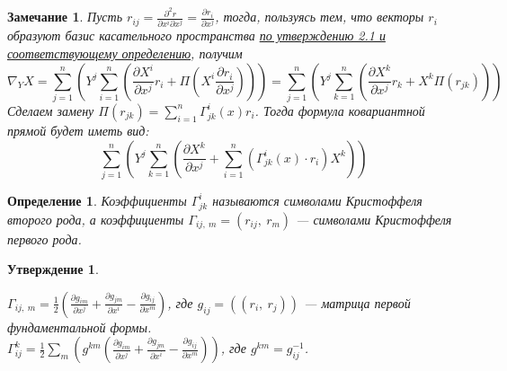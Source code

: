 \documentclass[12pt]{article}
\theoremstyle{plain}
\newtheorem{subtheorem}{Утверждение}[section]
\newtheorem{definition}{Определение}[section]
\newtheorem{remark}{Замечание}
\begin{document}
    \begin{remark}
        Пусть $r_{ij}=\frac{\partial^2 r}{\partial x^i\partial x^j}=\frac{\partial r_i}{\partial x^j}$, тогда, пользуясь тем, что векторы $r_i$ образуют базис касательного пространства \hyperlink{5}{по утверждению 2.1 и соответствующему определению}, получим $$\nabla_YX=\sum\limits_{j=1}^n\left(Y^j\sum\limits_{i=1}^n\left(\frac{\partial X^i}{\partial x^j}r_i+\Pi\left(X^i\frac{\partial r_i}{\partial x^j}\right)\right)\right)=\sum\limits_{j=1}^n\left(Y^j\sum\limits_{k=1}^n\left(\frac{\partial X^k}{\partial x^j}r_k+X^k\Pi(r_{jk})\right)\right)$$
        Сделаем замену $\Pi(r_{jk})=\sum\limits_{i=1}^n\Gamma_{jk}^i(x)r_i$. Тогда формула ковариантной прямой будет иметь вид:
        $$\sum\limits_{j=1}^n\left(Y^j\sum\limits_{k=1}^n\left(\frac{\partial X^k}{\partial x^j}+\sum\limits_{i=1}^n\left(\Gamma_{jk}^i(x)\cdot r_i\right)X^k\right)\right)$$
    \end{remark}
    \begin{definition}
        Коэффициенты $\Gamma_{jk}^i$ называются символами Кристоффеля второго рода, а коэффициенты $\Gamma_{ij, \ m}=(r_{ij}, \ r_m)$ --- символами Кристоффеля первого рода.
    \end{definition}
    \begin{subtheorem}\hypertarget{10}{}
        $\Gamma_{ij, \ m}=\frac{1}{2}\left(\frac{\partial g_{im}}{\partial x^j}+\frac{\partial g_{jm}}{\partial x^i}-\frac{\partial g_{ij}}{\partial x^m}\right)$, где $g_{ij}=((r_i, \ r_j))$ --- матрица первой фундаментальной формы.\\
        $\Gamma_{ij}^k=\frac{1}{2}\sum\limits_m\left(g^{km}\left(\frac{\partial g_{im}}{\partial x^j}+\frac{\partial g_{jm}}{\partial x^i}-\frac{\partial g_{ij}}{\partial x^m}\right)\right)$, где $g^{km}=g_{ij}^{-1}$.
    \end{subtheorem}
\end{document}
